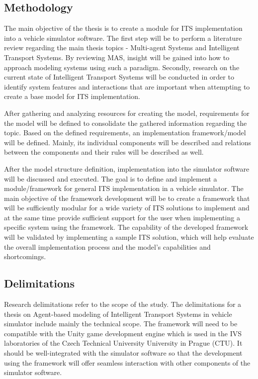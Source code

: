 \documentclass[titlepage, 12pt]{article}
\begin{document}

\subsection{Methodology}

The main objective of the thesis is to create a module for ITS implementation into a vehicle simulator software. 
The first step will be to perform a literature review regarding the main thesis topics - Multi-agent Systems and 
Intelligent Transport Systems. By reviewing MAS, insight will be gained into how to approach modeling systems using 
such a paradigm. Secondly, research on the current state of Intelligent Transport Systems will be conducted in 
order to identify system features and interactions that are important when attempting to create a 
base model for ITS implementation. 

After gathering and analyzing resources for creating the model, requirements for the model will be defined to consolidate 
the gathered information regarding the topic. Based on the defined requirements, an implementation framework/model will be 
defined. Mainly, its individual components will be described and relations between the components and their rules will be 
described as well. 

After the model structure definition, implementation into the simulator software will be discussed and executed. 
The goal is to define and implement a module/framework for general ITS implementation in a vehicle simulator. 
The main objective of the framework development will be to create a framework that will be sufficiently modular for 
a wide variety of ITS solutions to implement and at the same time provide sufficient support for the user when 
implementing a specific system using the framework. The capability of the developed framework will be validated
by implementing a sample ITS solution, which will help evaluate the overall implementation process and the 
model's capabilities and shortcomings.

\subsection{Delimitations}

Research delimitations refer to the scope of the study. The delimitations
for a thesis on Agent-based modeling of Intelligent Transport Systems in vehicle simulator include mainly 
the technical scope. The framework will need to be compatible with the Unity game development engine which 
is used in the IVS laboratories of the Czech Technical University University in Prague (CTU). It should be well-integrated with the simulator software so that 
the development using the framework will offer seamless interaction with other components of the simulator software. 
\end{document}
